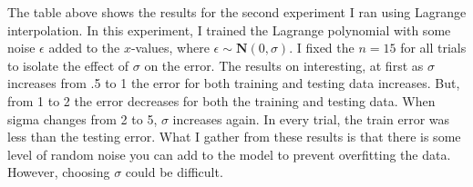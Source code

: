 \documentclass[a4paper]{article}
\theoremstyle{definition}
\newenvironment{soln}{
    \leavevmode\color{blue}\ignorespaces
}{}
\begin{document}
\begin{soln}
  The table above shows the results for the second experiment I ran using Lagrange interpolation.
  In this experiment, I trained the Lagrange polynomial with some noise $\epsilon$ added to the $x$-values, where $\epsilon \sim \mathbf{N}(0, \sigma)$.
  I fixed the $n=15$ for all trials to isolate the effect of $\sigma$ on the error.
  The results on interesting, at first as $\sigma$ increases from .5 to 1 the error for both training and testing data increases.
  But, from 1 to 2 the error decreases for both the training and testing data.
  When sigma changes from 2 to 5, $\sigma$ increases again.
  In every trial, the train error was less than the testing error.
  What I gather from these results is that there is some level of random noise you can add to the model to prevent overfitting the data.
  However, choosing $\sigma$ could be difficult.
\end{soln}




\end{document}
